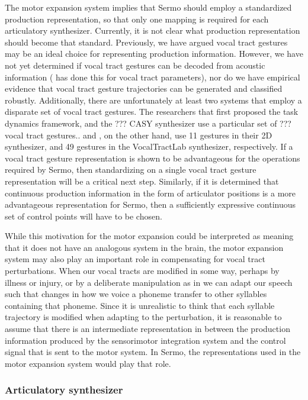The motor expansion system implies
that Sermo should employ
a standardized production representation,
so that only one mapping is required
for each articulatory synthesizer.
Currently, it is not clear
what production representation
should become that standard.
Previously, we have argued
vocal tract gestures may be an
ideal choice for representing production information.
However, we have not yet determined
if vocal tract gestures can be decoded
from acoustic information
(\citealt{uria2011} has done this for vocal tract parameters),
nor do we have empirical evidence
that vocal tract gesture trajectories
can be generated and classified robustly.
Additionally, there are unfortunately
at least two systems that employ
a disparate set of vocal tract gestures.
The researchers that first proposed
the task dynamics framework,
and the ??? CASY synthesizer
use a particular set of ??? vocal tract gestures..
\citet{kroger2014} and \citet{birkholz2006,birkholz2013},
on the other hand,
use 11 gestures in their 2D synthesizer,
and 49 gestures in the VocalTractLab synthesizer,
respectively.
If a vocal tract gesture representation
is shown to be advantageous
for the operations required by Sermo,
then standardizing on a single
vocal tract gesture representation
will be a critical next step.
Similarly,
if it is determined that
continuous production information
in the form of articulator positions
is a more advantageous representation
for Sermo,
then a sufficiently expressive
continuous set of control points
will have to be chosen.

While this motivation for the
motor expansion could be interpreted
as meaning that it does not
have an analogous system in the brain,
the motor expansion system
may also play an important role
in compensating for vocal tract perturbations.
When our vocal tracts are modified in some way,
perhaps by illness or injury,
or by a deliberate manipulation
as in \citet{houde1998}
we can adapt our speech
such that changes in how we voice a phoneme
transfer to other syllables containing that phoneme.
Since it is unrealistic to think that
each syllable trajectory is modified
when adapting to the perturbation,
it is reasonable to assume that
there is an intermediate representation
in between the production information
produced by the sensorimotor integration system
and the control signal that is sent
to the motor system.
In Sermo, the representations used
in the motor expansion system
would play that role.

\subsubsection{Articulatory synthesizer}

